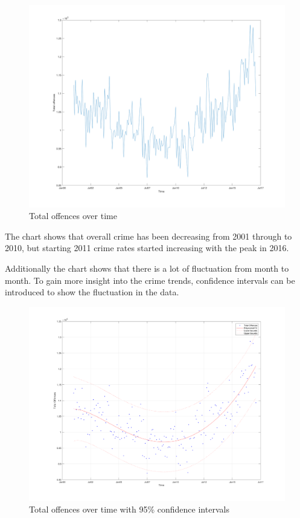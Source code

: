 \documentclass[]{article}
\begin{document}
\begin{figure}[H]
    \caption{Total offences over time}
    \centering
    \includegraphics[width=\linewidth]{../images/crime_over_time}
\end{figure}

The chart shows that overall crime has been decreasing from 2001 through to 2010, 
but starting 2011 crime rates started increasing with the peak in 2016.

Additionally the chart shows that there is a lot of fluctuation from month to month.
To gain more insight into the crime trends, confidence intervals can be introduced to show the fluctuation in the data.

\begin{figure}[H]
    \caption{Total offences over time with 95\% confidence intervals}
    \centering
    \label{fig:crime_confidence}
    \includegraphics[width=\linewidth]{../images/crime_over_time_confidence}
\end{figure}
\end{document}
